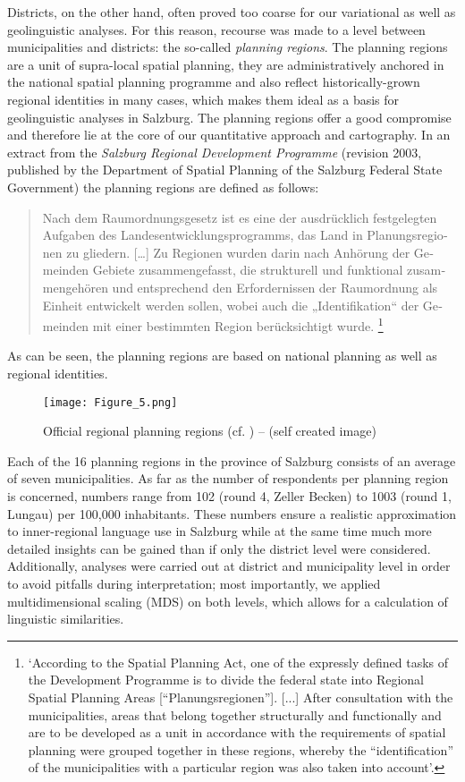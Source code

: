 \documentclass[output=paper,colorlinks, citecolor=brown]{langscibook}
\begin{document}
Districts, on the other hand, often proved too coarse for our variational as well as geolinguistic analyses. For this reason, recourse was made to a level between municipalities and districts: the so-called \textit{planning regions}. The planning regions are a unit of supra\hyp local spatial planning, they are administratively anchored in the national spatial planning programme and also reflect historically-grown regional identities in many cases, which makes them ideal as a basis for geolinguistic analyses in Salzburg. The planning regions offer a good compromise and therefore lie at the core of our quantitative approach and cartography. In an extract from the \textit{Salzburg Regional Development Programme} (revision 2003, published by the Department of Spatial Planning of the Salzburg Federal State Government) the planning regions are defined as follows:

\begin{quote}
\foreignlanguage{ngerman}{Nach dem Raumordnungsgesetz ist es eine der ausdrücklich festgelegten Aufgaben des Landesentwicklungsprogramms, das Land in Planungsregionen zu gliedern. […] Zu Regionen wurden darin nach Anhörung der Gemeinden Gebiete zusammengefasst, die strukturell und funktional zusammengehören und entsprechend den Erfordernissen der Raumordnung als Einheit entwickelt werden sollen, wobei auch die „Identifikation“ der Gemeinden mit einer bestimmten Region berücksichtigt wurde.} \citep[90]{Mair2003}\footnote{`According to the Spatial Planning Act, one of the expressly defined tasks of the Development Programme is to divide the federal state into Regional Spatial Planning Areas [“Planungsregionen”]. [...] After consultation with the municipalities, areas that belong together structurally and functionally and are to be developed as a unit in accordance with the requirements of spatial planning were grouped together in these regions, whereby the ``identification'' of the municipalities with a particular region was also taken into account'.}
\end{quote}

As can be seen, the planning regions are based on national planning as well as regional identities.\largerpage

\begin{figure}
\texttt{[image: Figure\_5.png]} \label{fig:blaßnigg:5}
\caption{Official regional planning regions (cf. \citealt{Mair2003}) -- (self created image)}
\end{figure}

Each of the 16 planning regions in the province of Salzburg consists of an average of seven municipalities. As far as the number of respondents per planning region is concerned, numbers range from 102 (round 4, Zeller Becken) to 1003 (round 1, Lungau) per 100,000 inhabitants. These numbers ensure a realistic approximation to inner-regional language use in Salzburg while at the same time much more detailed insights can be gained than if only the district level were considered. Additionally, analyses were carried out at district and municipality level in order to avoid pitfalls during interpretation; most importantly, we applied multidimensional scaling (MDS) on both levels, which allows for a calculation of linguistic similarities.
\end{document}
